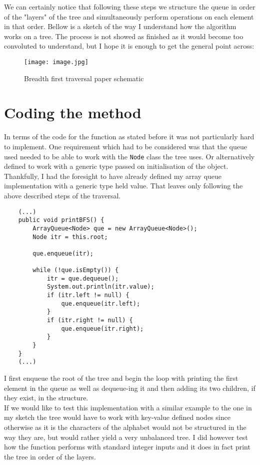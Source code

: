\documentclass[a4paper,11pt]{article}
\begin{document}
We can certainly notice that following these steps we structure the queue in order of the "layers" of the tree and simultaneously perform operations on each element in that order. Bellow is a sketch of the way I understand how the algorithm works on a tree. The process is not showed as finished as it would become too convoluted to understand, but I hope it is enough to get the general point across:


\begin{figure}[H]
    \centering
    \texttt{[image: image.jpg]}
    \caption{Breadth first traversal paper schematic}
    \label{fig:enter-label}
\end{figure}

\section*{Coding the method}

In terms of the code for the function as stated before it was not particularly hard to implement. One requirement which had to be considered was that the queue used needed to be able to work with the {\tt Node} class the tree uses. Or alternatively defined to work with a generic type passed on initialisation of the object. Thankfully, I had the foresight to have already defined my array queue implementation with a generic type held value. That leaves only following the above described steps of the traversal.

\begin{verbatim}
    (...)
    public void printBFS() {
        ArrayQueue<Node> que = new ArrayQueue<Node>();
        Node itr = this.root;
        
        que.enqueue(itr);

        while (!que.isEmpty()) {
            itr = que.dequeue();
            System.out.println(itr.value);
            if (itr.left != null) {
                que.enqueue(itr.left);
            }
            if (itr.right != null) {
                que.enqueue(itr.right);
            }
        }
    }
    (...)
\end{verbatim}

I first enqueue the root of the tree and begin the loop with printing the first element in the queue as well as dequeue-ing it and then adding its two children, if they exist, in the structure.
\\

If we would like to test this implementation with a similar example to the one in my sketch the tree would have to work with key-value defined nodes since otherwise as it is the characters of the alphabet would not be structured in the way they are, but would rather yield a very unbalanced tree. I did however test how the function performs with standard integer inputs and it does in fact print the tree in order of the layers.
\end{document}

